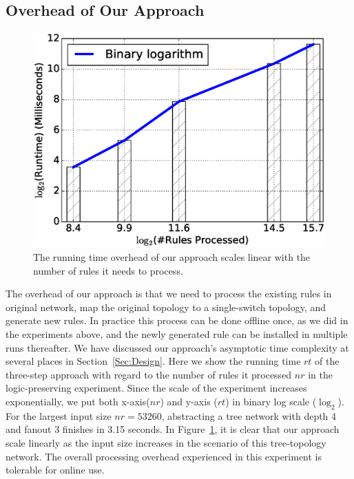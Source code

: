 \subsection{Overhead of Our Approach}

\begin{figure}[t]
\centering
\includegraphics[scale=.42]{figures/bs_overhead.eps}
\caption{The running time overhead of our approach scales linear with the number of
        rules it needs to process.}
\label{Fig:BSOverhead}
\end{figure}

The overhead of our approach is that we need to process the existing rules in original network,
map the original topology to a single-switch topology, and
generate new rules.
In practice this process can be done offline once, as we did in the experiments above,
and the newly generated rule can be installed in multiple runs thereafter.
We have discussed our approach's asymptotic time complexity at several places in Section~\ref{Sec:Design}.
Here we show the running time $rt$ of the three-step approach with regard to
the number of rules it processed $nr$ in the logic-preserving experiment.
Since the scale of the experiment increases exponentially, we put both x-axis($nr$)
and y-axis ($rt$) in binary log scale ($\log_2$).
For the largest input size $nr=53260$, abstracting a tree network with depth 4 and
fanout 3 finishes in 3.15 seconds.
In Figure~\ref{Fig:BSOverhead}, it is clear that our approach scale linearly as the
input size increases in the scenario of this tree-topology network.
The overall processing overhead experienced in this experiment is tolerable for online use.

